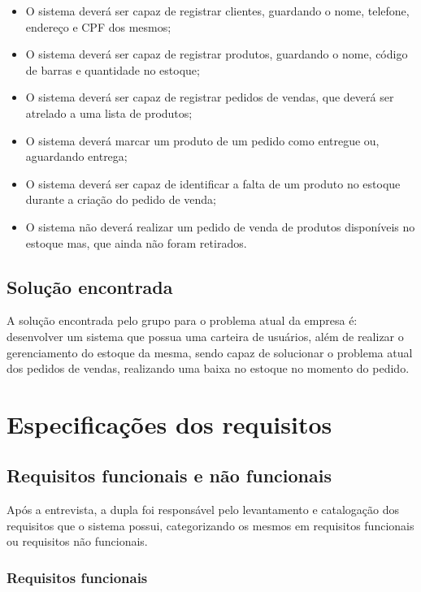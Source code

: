 \documentclass[serif, english, brazilian, oneside]{uffstex}
\begin{document}
\begin{itemize}
    \item O sistema deverá ser capaz de registrar clientes, guardando o nome, telefone, endereço e CPF dos mesmos;
    \item O sistema deverá ser capaz de registrar produtos, guardando o nome, código de barras e quantidade no estoque;
    \item O sistema deverá ser capaz de registrar pedidos de vendas, que deverá ser atrelado a uma lista de produtos;
    \item O sistema deverá marcar um produto de um pedido como entregue ou, aguardando entrega;
    \item O sistema deverá ser capaz de identificar a falta de um produto no estoque durante a criação do pedido de venda;
    \item O sistema não deverá realizar um pedido de venda de produtos disponíveis no estoque mas, que ainda não foram retirados.
\end{itemize}

\section{Solução encontrada}

A solução encontrada pelo grupo para o problema atual da empresa é: desenvolver um sistema que possua uma carteira de usuários, além de realizar o gerenciamento do estoque da mesma, sendo capaz de solucionar o problema atual dos pedidos de vendas, realizando uma baixa no estoque no momento do pedido.

\chapter{Especificações dos requisitos}



\section{Requisitos funcionais e não funcionais}

Após a entrevista, a dupla foi responsável pelo levantamento e catalogação dos requisitos que o sistema possui, categorizando os mesmos em requisitos funcionais ou requisitos não funcionais.

\subsection{Requisitos funcionais}
\end{document}
